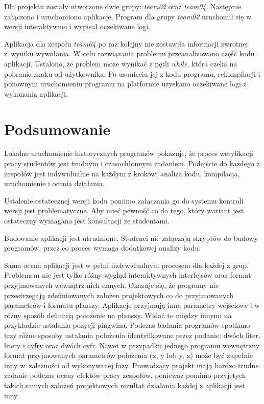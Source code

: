 Dla projektu zostały utworzone dwie grupy:  \textit{team02} oraz \textit{team04}.
Następnie załączono i uruchomiono aplikacje.
Program dla grupy \textit{team02} uruchomił się w wersji interaktywnej i wypisał oczekiwane logi.

Aplikacja dla zespołu \textit{team04} po raz kolejny nie zostawiła informacji zwrotnej z~wyniku wywołania.
W celu rozwiązania problemu przeanalizowano część kodu aplikacji.
Ustalono, że problem może wynikać z pętli \textit{while}, która czeka na pobranie znaku od użytkownika.
Po usunięciu jej z kodu programu, rekompilacji i ponownym uruchomieniu programu na platformie uzyskano oczekiwane logi z wykonania aplikacji.


\section{Podsumowanie}
\label{verification_summary}

Lokalne uruchomienie historycznych programów pokazuje, że proces weryfikacji pracy studentów jest trudnym i czasochłonnym zadaniem.
Podejście do każdego z zespołów jest indywidualne na każdym z kroków: analiza kodu, kompilacja, uruchomienie i ocenia działania.

Ustalenie ostatecznej wersji kodu pomimo załączania go do systemu kontroli wersji jest problematyczne.
Aby mieć pewność co do tego, który wariant jest ostateczny wymagana jest konsultacji ze studentami.

Budowanie aplikacji jest utrudnione.
Studenci nie załączają skryptów do budowy programów, przez co proces wymaga dodatkowej analizy kodu.

Sama ocena aplikacji jest w pełni indywidualnym procesem dla każdej z grup.
Problemem nie jest tylko różny wygląd interaktywnych interfejsów oraz format przyjmowanych wewnątrz nich danych.
Okazuje się, że programy nie przestrzegają zdefiniowanych założen projektowych co do przyjmowanych parametrów i formatu planszy.
Aplikacje przyjmują inne parametry wejściowe i w różny sposób definiują położenie na planszy.
Widać to między innymi na przykładzie ustalania pozycji pingwina.
Podczas badania programów spotkano trzy różne sposoby ustalania położenia identyfikowane przez podanie: dwóch liter, litery i cyfry oraz dwóch cyfr.
Nawet w przypadku jednego programu wewnętrzny format przyjmowanych parametrów położenia (x, y lub y, x) może być zupełnie inny w~zależności od wykonywanej fazy.
Prowadzący projekt mają bardzo trudne zadanie podczas oceny efektów pracy zespołów, ponieważ pomimo przyjętych takich samych założeń projektowych rezultat działania każdej z aplikacji jest inny.

